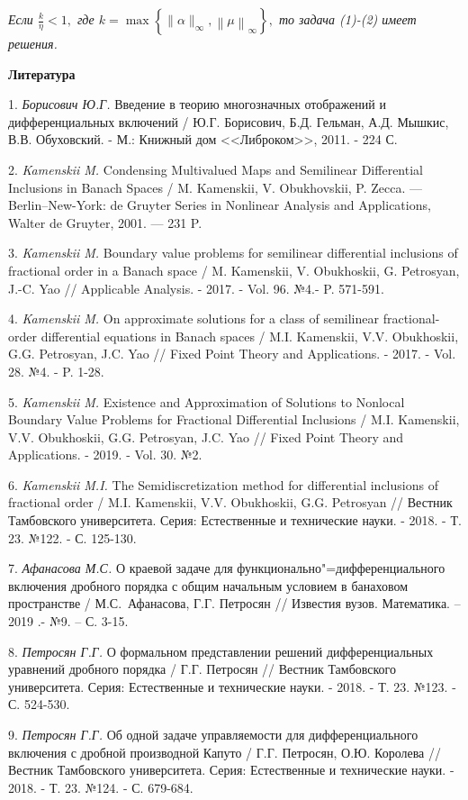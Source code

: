 {\it Если $\frac{k}{\eta} < 1,$ где $k=\max\left\{\|\alpha\|_\infty, \left\|\mu\right\|_{\infty}\right\},$ то задача (1)-(2) имеет решения.}


\smallskip \centerline {\bf Литература} \nopagebreak

1. {\it Борисович Ю.Г.} Введение в теорию многозначных ото\-бражений и дифференциальных включений / Ю.Г. Борисович, Б.Д. Гельман, А.Д. Мышкис, В.В. Обуховский. - М.: Книжный дом <<Либроком>>, 2011. - 224 С.


2. {\it Kamenskii M.} Condensing Multivalued Maps and Semilinear Differential Inclusions in Banach Spaces / M. Kamenskii, V. Obukhovskii, P. Zecca. --- Berlin--New-York: de Gruyter Series in Nonlinear Analysis and Applications, Walter de Gruyter, 2001. --- 231 P.

3. {\it Kamenskii M.}  Boundary value problems for semilinear differential inclusions of fractional order in a Banach space / M.  Kamenskii, V. Obukhoskii, G. Petrosyan, J.-C. Yao //  Applicable Analysis. - 2017. - Vol. 96. №4.- P. 571-591.

4. {\it Kamenskii M.}  On approximate solutions for a class of semilinear fractional-order differential equations in Banach spa\-ces / M.I. Kamenskii, V.V. Obukhoskii, G.G. Petrosyan, J.C. Yao // Fixed Point Theory and Applications. - 2017. - Vol. 28. №4. -  P. 1-28.

5. {\it Kamenskii M.}  Existence and Approximation of Solutions to Nonlocal Boundary Value Problems for  Fractional Differential Inclusions / M.I. Kamenskii, V.V. Obukhoskii, G.G. Petrosyan, J.C. Yao // Fixed Point Theory and Applications. - 2019. - Vol. 30. №2.

6. {\it Kamenskii M.I.} The Semidiscretization method for differential inclusions of fractional order / M.I. Kamenskii, V.V. Obukhoskii, G.G. Petrosyan //  Вестник Тамбовского университета. Серия: Естественные и технические науки. - 2018. - Т. 23. №122. -  С. 125-130.

7. {\it Афанасова М.С.} О краевой задаче для функционально"=дифференциального включения дробного порядка с общим начальным условием  в банаховом пространстве / \linebreak М.С.~Афанасова, Г.Г. Петросян // Известия вузов. Математика. – 2019 .- №9. – С. 3-15.

8. {\it Петросян Г.Г.} О формальном представлении решений дифференциальных уравнений дробного порядка / Г.Г. Петросян // Вестник Тамбовского университета. Серия: Естественные и технические науки. -  2018. - Т. 23. №123. - С. 524-530.

9. {\it Петросян Г.Г.} Об одной задаче управляемости для дифференциального включения с дробной производной Капуто  / Г.Г. Петросян, О.Ю. Королева // Вестник Тамбовского университета. Серия: Естественные и технические науки. - 2018. - Т. 23. №124. - С. 679-684.











